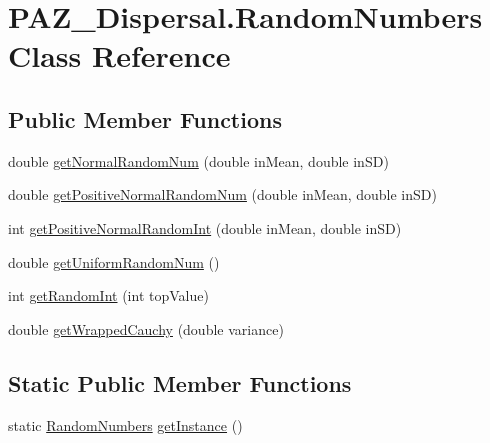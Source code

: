 \hypertarget{class_p_a_z___dispersal_1_1_random_numbers}{\section{P\-A\-Z\-\_\-\-Dispersal.\-Random\-Numbers Class Reference}
\label{class_p_a_z___dispersal_1_1_random_numbers}
}
\subsection*{Public Member Functions}
\begin{DoxyCompactItemize}
\item 
double \hyperlink{class_p_a_z___dispersal_1_1_random_numbers_ab71c4ba388321b6ea5bd2983d54ac329}{get\-Normal\-Random\-Num} (double in\-Mean, double in\-S\-D)
\begin{DoxyCompactList}\small\item\em \end{DoxyCompactList}\item 
double \hyperlink{class_p_a_z___dispersal_1_1_random_numbers_a63700b77b3cf74f45621f14927969755}{get\-Positive\-Normal\-Random\-Num} (double in\-Mean, double in\-S\-D)
\item 
int \hyperlink{class_p_a_z___dispersal_1_1_random_numbers_a00d08a224e75b0eab65c5575b39952ae}{get\-Positive\-Normal\-Random\-Int} (double in\-Mean, double in\-S\-D)
\item 
double \hyperlink{class_p_a_z___dispersal_1_1_random_numbers_a25c4382a9d88cd6acd3a29676c782f2c}{get\-Uniform\-Random\-Num} ()
\item 
int \hyperlink{class_p_a_z___dispersal_1_1_random_numbers_a5aa319b320c9210c3f639c34b300bfa9}{get\-Random\-Int} (int top\-Value)
\item 
double \hyperlink{class_p_a_z___dispersal_1_1_random_numbers_a3acfbdd6791e8bc54b8f2c10f15980cb}{get\-Wrapped\-Cauchy} (double variance)
\end{DoxyCompactItemize}
\subsection*{Static Public Member Functions}
\begin{DoxyCompactItemize}
\item 
static \hyperlink{class_p_a_z___dispersal_1_1_random_numbers}{Random\-Numbers} \hyperlink{class_p_a_z___dispersal_1_1_random_numbers_a87f1c654c05428ece71ddbfdd11d636b}{get\-Instance} ()
\end{DoxyCompactItemize}
